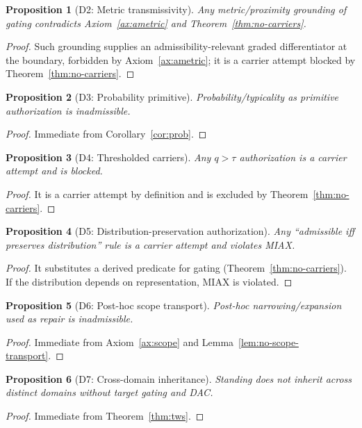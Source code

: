 \documentclass[12pt]{article}
\newtheorem{proposition}{Proposition}
\begin{document}
\begin{proposition}[D2: Metric transmissivity]
Any metric/proximity grounding of gating contradicts Axiom~\ref{ax:ametric} and Theorem~\ref{thm:no-carriers}.
\end{proposition}
\begin{proof}
Such grounding supplies an admissibility-relevant graded differentiator at the boundary, forbidden by Axiom~\ref{ax:ametric}; it is a carrier attempt blocked by Theorem~\ref{thm:no-carriers}. \end{proof}

\begin{proposition}[D3: Probability primitive]
Probability/typicality as primitive authorization is inadmissible.
\end{proposition}
\begin{proof}
Immediate from Corollary~\ref{cor:prob}. \end{proof}

\begin{proposition}[D4: Thresholded carriers]
Any $q>\tau$ authorization is a carrier attempt and is blocked.
\end{proposition}
\begin{proof}
It is a carrier attempt by definition and is excluded by Theorem~\ref{thm:no-carriers}. \end{proof}

\begin{proposition}[D5: Distribution-preservation authorization]
Any ``admissible iff preserves distribution'' rule is a carrier attempt and violates MIAX.
\end{proposition}
\begin{proof}
It substitutes a derived predicate for gating (Theorem~\ref{thm:no-carriers}). If the distribution depends on representation, MIAX is violated. \end{proof}

\begin{proposition}[D6: Post-hoc scope transport]
Post-hoc narrowing/expansion used as repair is inadmissible.
\end{proposition}
\begin{proof}
Immediate from Axiom~\ref{ax:scope} and Lemma~\ref{lem:no-scope-transport}. \end{proof}

\begin{proposition}[D7: Cross-domain inheritance]
Standing does not inherit across distinct domains without target gating and DAC.
\end{proposition}
\begin{proof}
Immediate from Theorem~\ref{thm:tws}. \end{proof}
\end{document}
